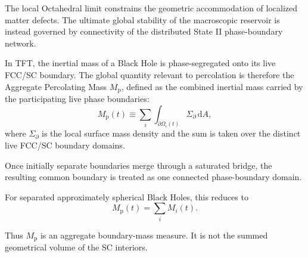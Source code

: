 The local Octahedral limit constrains the geometric accommodation of localized
matter defects. The ultimate global stability of the macroscopic reservoir is
instead governed by connectivity of the distributed State II phase-boundary
network.

In TFT, the inertial mass of a Black Hole is phase-segregated onto its live
FCC/SC boundary. The global quantity relevant to percolation is therefore the
Aggregate Percolating Mass \(M_{\mathrm p}\), defined as the combined inertial
mass carried by the participating live phase boundaries:
\begin{equation}
    M_{\mathrm p}(t)
    \equiv
    \sum_i
    \int_{\partial\Omega_i(t)}
    \Sigma_{\partial}
    \,\mathrm dA,
\end{equation}
where \(\Sigma_{\partial}\) is the local surface mass density and the sum is
taken over the distinct live FCC/SC boundary domains.

Once initially separate boundaries merge through a saturated bridge, the
resulting common boundary is treated as one connected phase-boundary domain.

For separated approximately spherical Black Holes, this reduces to
\begin{equation}
    M_{\mathrm p}(t)
    =
    \sum_i
    M_i(t).
\end{equation}

Thus \(M_{\mathrm p}\) is an aggregate boundary-mass measure. It is not the
summed geometrical volume of the SC interiors.

